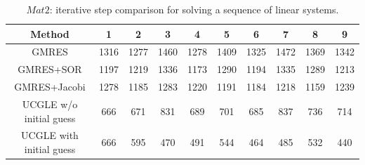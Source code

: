 \begin{table}[htbp]
	\small
	\label{tb3}
	\caption{$Mat2$:  iterative step comparison for solving a sequence of linear systems.}
	\centering
	\renewcommand{\arraystretch}{1.6}
	\begin{tabular}{c*{9}{c}}
		\toprule
		\cellcolor{gray!50}Method              & \cellcolor{gray!50}1 &  \cellcolor{gray!50}2 &  \cellcolor{gray!50}3 &  \cellcolor{gray!50}4 &  \cellcolor{gray!50}5  &  \cellcolor{gray!50}6  & \cellcolor{gray!50}7 & \cellcolor{gray!50}8 & \cellcolor{gray!50}9\\
		\midrule
		GMRES & 1316	&1277	&1460	&1278	&1409	&1325	&1472	&1369	&1342\\
			\cellcolor{gray!20}GMRES+SOR            & 	\cellcolor{gray!20}1197&		\cellcolor{gray!20}1219&		\cellcolor{gray!20}1336&		\cellcolor{gray!20}1173	&	\cellcolor{gray!20}1290	&	\cellcolor{gray!20}1194	&	\cellcolor{gray!20}1335	&	\cellcolor{gray!20}1289	&	\cellcolor{gray!20}1213\\
		GMRES+Jacobi            & 1278&	1185	&1283&	1220	&1191&	1184	&1218&	1159&	1239\\
			\cellcolor{gray!20}UCGLE w/o initial guess     & 	\cellcolor{gray!20}666	&	\cellcolor{gray!20}671	&	\cellcolor{gray!20}831	&	\cellcolor{gray!20}689	&	\cellcolor{gray!20}701	&	\cellcolor{gray!20}685	&	\cellcolor{gray!20}837	&	\cellcolor{gray!20}736	&	\cellcolor{gray!20}714\\
		UCGLE with initial guess     & 666	&595	&470	&491	&544	&464	&485	&532	&440\\
		\hline
	\end{tabular}
\end{table}

